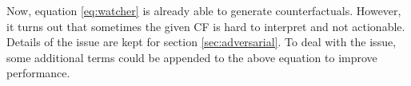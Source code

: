 Now, equation \ref{eq:watcher} is already able to generate counterfactuals. However, it turns out that sometimes the given CF is hard to interpret and not actionable. Details of the issue are kept for section \ref{sec:adversarial}. To deal with the issue, some additional terms could be appended to the above equation to improve performance.
